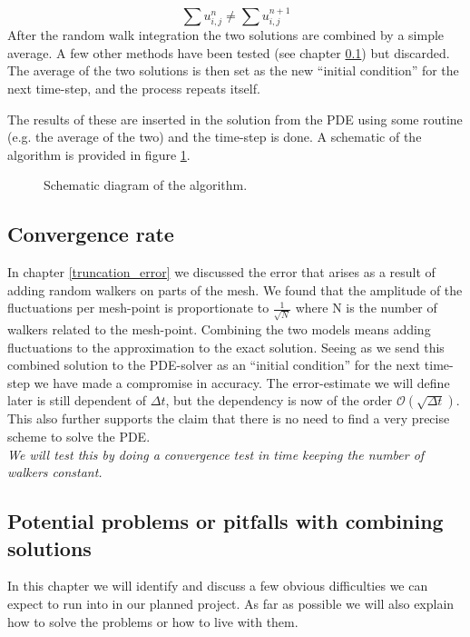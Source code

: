 \begin{equation}\label{integral_u}
 \sum u_{i,j}^n \neq \sum u_{i,j}^{n+1}
\end{equation}
After the random walk integration the two solutions are combined by a simple average. A few other methods have been tested (see chapter \ref{}) but discarded. 
The average of the two solutions is then set as the new ``initial condition'' for the next time-step, and the  process repeats itself.

The results of these are inserted in the solution from the PDE using some routine (e.g. the average of the two) and the time-step is done. 
A schematic of the algorithm is provided in figure \ref{schematic}.

\begin{figure}[H]
\centering
\caption[Algorithm]{Schematic diagram of the algorithm.}
\label{schematic}
\end{figure}

\subsection{Convergence rate}

In chapter \ref{truncation_error} we discussed the error that arises as a result of adding random walkers on parts of the mesh. 
We found that the amplitude of the fluctuations per mesh-point is proportionate to $\frac{1}{\sqrt{N}}$ where N is the number of walkers related to the mesh-point. 
Combining the two models means adding fluctuations to the approximation to the exact solution. Seeing as we send this combined solution to the PDE-solver as an ``initial condition'' for the next time-step we have made a compromise in accuracy. The error-estimate we will define later is still dependent of $\Delta t$, but the dependency is now of the order $\mathcal{O}(\sqrt{\Delta t})$. 
This also further supports the claim that there is no need to find a very precise scheme to solve the PDE.\\
\emph{We will test this by doing a convergence test in time keeping the number of walkers constant.}

\subsection{Potential problems or pitfalls with combining solutions}\label{problems_and_pitfalls}
 
In this chapter we will identify and discuss a few obvious difficulties we can expect to run into in our planned project. As far as possible we will also explain how to solve the problems or how to live with them.


